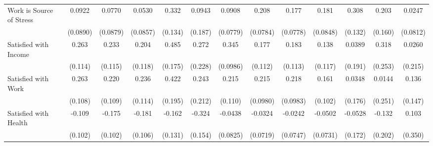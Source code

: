 {\begin{tabular}{l*{12}{c}}
\addlinespace
Work is Source of Stress&      0.0922         &      0.0770         &      0.0530         &       0.332\sym{*}  &      0.0943         &      0.0908         &       0.208\sym{**} &       0.177\sym{*}  &       0.181\sym{*}  &       0.308\sym{*}  &       0.203         &      0.0247         \\
            &    (0.0890)         &    (0.0879)         &    (0.0857)         &     (0.134)         &     (0.187)         &    (0.0779)         &    (0.0784)         &    (0.0778)         &    (0.0848)         &     (0.132)         &     (0.160)         &    (0.0812)         \\
\addlinespace
Satisfied with Income&       0.263\sym{*}  &       0.233\sym{*}  &       0.204         &       0.485\sym{**} &       0.272         &       0.345\sym{***}&       0.177         &       0.183         &       0.138         &      0.0389         &       0.318         &      0.0260         \\
            &     (0.114)         &     (0.115)         &     (0.118)         &     (0.175)         &     (0.228)         &    (0.0986)         &     (0.112)         &     (0.113)         &     (0.117)         &     (0.191)         &     (0.253)         &     (0.215)         \\
\addlinespace
Satisfied with Work&       0.263\sym{*}  &       0.220\sym{*}  &       0.236\sym{*}  &       0.422\sym{*}  &       0.243         &       0.215         &       0.215\sym{*}  &       0.218\sym{*}  &       0.161         &      0.0348         &      0.0144         &       0.136         \\
            &     (0.108)         &     (0.109)         &     (0.114)         &     (0.195)         &     (0.212)         &     (0.110)         &    (0.0980)         &    (0.0983)         &     (0.102)         &     (0.176)         &     (0.251)         &     (0.147)         \\
\addlinespace
Satisfied with Health&      -0.109         &      -0.175         &      -0.181         &      -0.162         &      -0.324\sym{*}  &     -0.0438         &     -0.0324         &     -0.0242         &     -0.0502         &     -0.0528         &      -0.132         &       0.103         \\
            &     (0.102)         &     (0.102)         &     (0.106)         &     (0.131)         &     (0.154)         &    (0.0825)         &    (0.0719)         &    (0.0747)         &    (0.0731)         &     (0.172)         &     (0.202)         &     (0.350)         \\

\end{tabular}}

